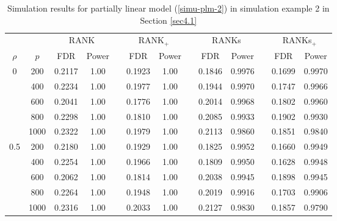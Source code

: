 \documentclass[11pt]{article}
\begin{document}
\begin{table}[htp!]
	\centering
	\caption{\label{tab-plm} Simulation results for partially linear model (\ref{simu-plm-2}) in simulation example 2 in Section \ref{sec4.1}}
	\vskip0.2cm
	\tabcolsep 0.15cm
	\begin{tabular}{ccccccccccccc}
		\toprule
	&	&  \multicolumn{2}{c}{RANK}&&\multicolumn{2}{c}{RANK$_+$} &&\multicolumn{2}{c}{RANKs}&&\multicolumn{2}{c}{RANKs$_+$}     \\
		\cline{3-4}\cline{6-7}\cline{9-10}\cline{12-13}
$\rho$	&	$ p$ &FDR & Power &  & FDR& Power && FDR & Power &  & FDR& Power  \\
		\hline
0&		200 &0.2117 & 1.00  &&0.1923  &1.00  &&0.1846  &0.9976  &&0.1699  &0.9970           \\
	&	400 &0.2234 & 1.00  &&0.1977  &1.00  &&0.1944  &0.9970  &&0.1747  &0.9966           \\
	&	600 &0.2041 & 1.00  &&0.1776  & 1.00 &&0.2014  &0.9968  &&0.1802  &0.9960           \\
	&	800 &0.2298 & 1.00  &&0.1810  & 1.00 &&0.2085  &0.9933  &&0.1902  &0.9930           \\
        & 1000    &0.2322 &  1.00  &&0.1979 & 1.00 && 0.2113  &0.9860  &&0.1851  &0.9840           \\
0.5   &	200 &0.2180 &1.00   &&0.1929  &1.00  &&0.1825  &0.9952  &&0.1660  &0.9949       \\
	&	400 &0.2254 &1.00   &&0.1966  &1.00  &&0.1809  &0.9950  &&0.1628  &0.9948       \\
	&	600 &0.2062 &1.00   &&0.1814  &1.00  &&0.2038  &0.9945  &&0.1898  &0.9945       \\
	&	800 &0.2264 &1.00   &&0.1948  &1.00  &&0.2019  &0.9916  &&0.1703  &0.9906        \\
           & 1000 &0.2316 & 1.00  &&0.2033  &1.00  &&0.2127  &0.9830  &&0.1857  &0.9790           \\
		\bottomrule
	\end{tabular}
\end{table}
		
\end{document}
